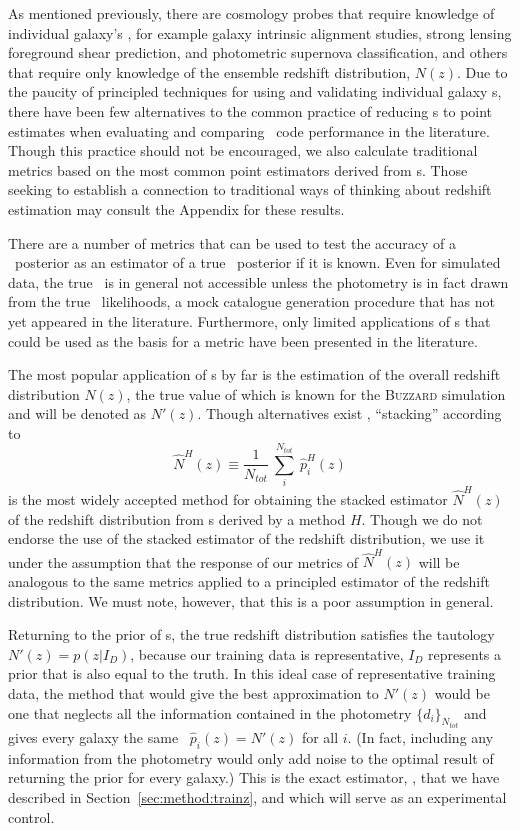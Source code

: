 As mentioned previously, there are cosmology probes that require knowledge of individual galaxy's \pzpdf, for example galaxy intrinsic alignment studies, strong lensing foreground shear prediction, and photometric supernova classification, and others that require only knowledge of the ensemble redshift distribution, $N(z)$.
Due to the paucity of principled techniques for using and validating individual galaxy \pzpdf s, there have been few alternatives to the common practice of reducing \pzpdf s to point estimates when evaluating and comparing \pz\ code performance in the literature.
Though this practice should not be encouraged, we also calculate traditional metrics based on the most common point estimators derived from \pzpdf s.
Those seeking to establish a connection to traditional ways of thinking about redshift estimation may consult the Appendix for these results.

There are a number of metrics that can be used to test the accuracy of a \pz\ posterior as an estimator of a true \pz\ posterior if it is known.
Even for simulated data, the true \pzpdf\ is in general not accessible unless the photometry is in fact drawn from the true \pz\ likelihoods, a mock catalogue generation procedure that has not yet appeared in the literature.
Furthermore, only limited applications of \pzpdf s that could be used as the basis for a metric have been presented in the literature.

The most popular application of \pspdf s by far is the estimation of the overall redshift distribution $N(z)$, the true value of which is known for the \textsc{Buzzard} simulation and will be denoted as $N'(z)$.
Though alternatives exist \citep{Malz:chippr}, ``stacking'' according to
\begin{equation} \label{eq:stacked}
\hat{N}^{H}(z) \equiv \frac{1}{N_{tot}}\ \sum_{i}^{N_{tot}}\ \hat{p}^{H}_{i}(z)
\end{equation}
is the most widely accepted method for obtaining the stacked estimator $\hat{N}^{H}(z)$ of the redshift distribution from \pzpdf s derived by a method $H$.
Though we do not endorse the use of the stacked estimator of the redshift distribution, we use it under the assumption that the response of our metrics of $\hat{N}^{H}(z)$ will be analogous to the same metrics applied to a principled estimator of the redshift distribution.
We must note, however, that this is a poor assumption in general.

Returning to the prior of \pzpdf s, the true redshift distribution satisfies the tautology $N'(z) = p(z | I_{D})$, because our training data is representative, $I_{D}$ represents a prior that is also equal to the truth.
In this ideal case of representative training data, the method that would give the best approximation to $N'(z)$ would be one that neglects all the information contained in the photometry $\{d_{i}\}_{N_{tot}}$ and gives every galaxy the same \pzpdf\ $\hat{p}_{i}(z) = N'(z)$ for all $i$.
(In fact, including any information from the photometry would only add noise to the optimal result of returning the prior for every galaxy.)
This is the exact estimator, \trainz, that we have described in Section~\ref{sec:method:trainz}, and which will serve as an experimental control.

